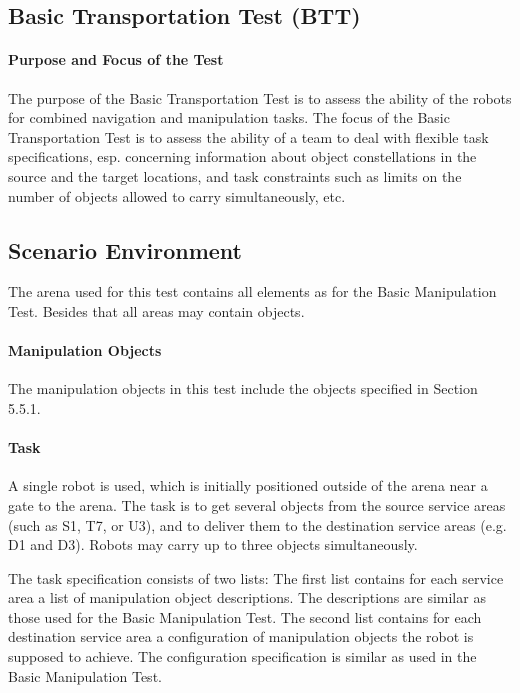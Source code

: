 \subsection{Basic Transportation Test (BTT)}

\paragraph{Purpose and Focus of the Test}
The purpose of the Basic Transportation Test is to assess the ability of the robots for combined navigation and manipulation tasks. 
The focus of the Basic Transportation Test is to assess the ability of a team to deal with flexible task specifications, esp. concerning information about object constellations in the source and the target locations, and task constraints such as limits on the number of objects allowed to carry simultaneously, etc.  

\subsection{Scenario Environment}
The arena used for this test contains all elements as for the Basic Manipulation Test. Besides that all areas may contain objects.

\paragraph{Manipulation Objects}
The manipulation objects in this test include the objects specified in Section 5.5.1.

\paragraph{Task}
A single robot is used, which is initially positioned outside of the arena near a gate to the arena. The task is to get several objects from the source service areas (such as S1, T7, or U3), and to deliver them to the destination service areas (e.g. D1 and D3). Robots may carry up to three objects simultaneously. 
\par
The task specification consists of two lists:
The first list contains for each service area a list of manipulation object descriptions. The descriptions are similar as those used for the Basic Manipulation Test. 
The second list contains for each destination service area a configuration of manipulation objects the robot is supposed to achieve. The configuration specification is similar as used in the Basic Manipulation Test. 

